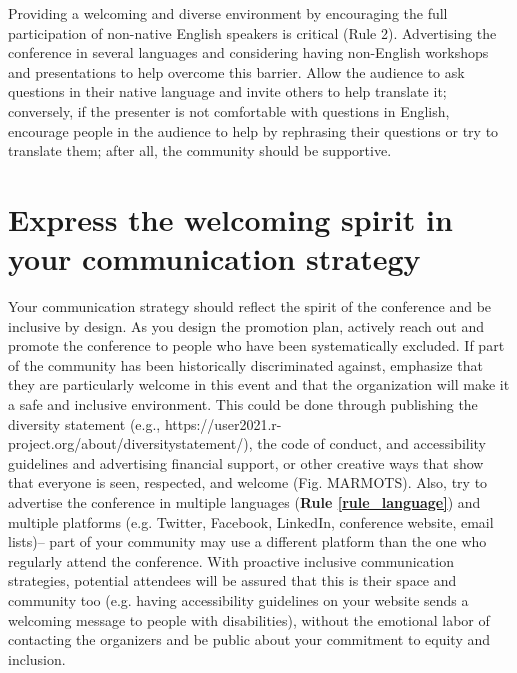 \documentclass[10pt,letterpaper]{article}
\begin{document}
Providing a welcoming and diverse environment by encouraging the full participation of non-native English speakers is critical (Rule 2). 
Advertising the conference in several languages and considering having non-English workshops and presentations to help overcome this barrier. 
Allow the audience to ask questions in their native language and invite others to help translate it; conversely, if the presenter is not comfortable with questions in English, encourage people in the audience to help by rephrasing their questions or try to translate them; after all, the community should be supportive. 



\section{Express the welcoming spirit in your communication strategy}
\label{rule_communication}

Your communication strategy should reflect the spirit of the conference and be inclusive by design. 
As you design the promotion plan, actively reach out and promote the conference to people who have been systematically excluded. 
If part of the community has been historically discriminated against, emphasize that they are particularly welcome in this event and that the organization will make it a safe and inclusive environment. This could be done through publishing the diversity statement (e.g., https://user2021.r-project.org/about/diversitystatement/), the code of conduct, and accessibility guidelines and advertising financial support, or other creative ways that show that everyone is seen, respected, and welcome (Fig. MARMOTS).
Also, try to advertise the conference in multiple languages (\textbf{Rule \ref{rule_language}}) and multiple platforms (e.g. Twitter, Facebook, LinkedIn, conference website, email lists)--
part of your community may use a different platform than the one who regularly attend the conference. 
With proactive inclusive communication strategies, potential attendees will be assured that this is their space and community too (e.g. having accessibility guidelines on your website sends a welcoming message to people with disabilities), without the emotional labor of contacting the organizers and be public about your commitment to equity and inclusion.
\end{document}
